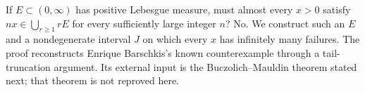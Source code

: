 If $E\subset(0,\infty)$ has positive Lebesgue measure, must almost every $x>0$ satisfy $nx\in\bigcup_{r\ge1}rE$ for every sufficiently large integer $n$? No. We construct such an $E$ and a nondegenerate interval $J$ on which every $x$ has infinitely many failures. The proof reconstructs Enrique Barschkis's known counterexample through a tail-truncation argument. Its external input is the Buczolich--Mauldin theorem stated next; that theorem is not reproved here.
